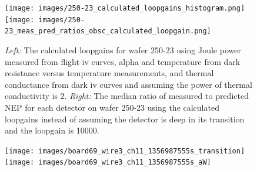 

\begin{figure}[ht!]
\begin{center}
\texttt{[image: images/250-23\_calculated\_loopgains\_histogram.png]}
\texttt{[image: images/250-23\_meas\_pred\_ratios\_obsc\_calculated\_loopgain.png]}
\caption{{\it Left:} The calculated loopgains for wafer 250-23 using Joule power measured from flight iv curves, alpha and temperature from dark resistance versus temperature measurements, and thermal conductance from dark iv curves and assuming the power of thermal conductivity is 2. {\it Right:} The median ratio of measured to predicted \ac{NEP} for each detector on wafer 250-23 using the calculated loopgains instead of assuming the detector is deep in its transition and the loopgain is 10000.}
\label{fig:loopgain_histogram}
\end{center}
\end{figure}



\begin{figure}[ht!]
\begin{center}
\texttt{[image: images/board69\_wire3\_ch11\_1356987555s\_transition]}
\texttt{[image: images/board69\_wire3\_ch11\_1356987555s\_aW]}
\caption{}
\label{fig:in_transition_psd}
\end{center}
\end{figure}

